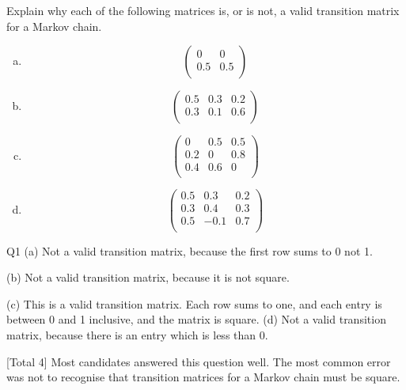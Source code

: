 \documentclass[a4paper,12pt]{article}
\begin{document}
\large
\noindent 
Explain why each of the following matrices is, or is not, a valid transition matrix for a
Markov chain.
\begin{enumerate}[(a)]
    \item 
\[\begin{pmatrix}
0 & 0 \\
0.5 & 0.5 \\
\end{pmatrix}\]
\bigskip

\item 
\[\begin{pmatrix}
0.5 & 0.3 & 0.2\\
0.3 & 0.1 & 0.6 \\
\end{pmatrix}\]
\bigskip
\item 

\[\begin{pmatrix}
 0 & 0.5 & 0.5\\ 
0.2 & 0 & 0.8 \\
0.4 & 0.6 & 0 \\
\end{pmatrix}\]
\bigskip

\item
\[\begin{pmatrix}
 0.5 & 0.3 & 0.2\\ 
0.3 & 0.4 & 0.3 \\
0.5 & -0.1 & 0.7 \\
\end{pmatrix}\]
\bigskip
\end{enumerate}


\newpage

Q1
(a) Not a valid transition matrix,
because the first row sums to 0 not 1. 

(b) Not a valid transition matrix,
because it is not square. 

(c) This is a valid transition matrix. 
Each row sums to one, and each entry is between 0 and 1
inclusive, and the matrix is square. 
(d)
Not a valid transition matrix,
because there is an entry which is less than 0.


[Total 4]
Most candidates answered this question well. The most common
error was not to recognise that transition matrices for a Markov
chain must be square.
\end{document}

